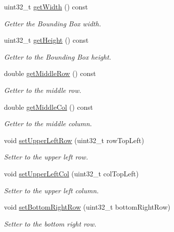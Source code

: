 \begin{DoxyCompactItemize}
uint32\+\_\+t \hyperlink{classfc_1_1BoundingBox_aecdcbec558ef3396ed42924d4937d981}{get\+Width} () const
\begin{DoxyCompactList}\small\item\em Getter the Bounding Box width. \end{DoxyCompactList}\item 
uint32\+\_\+t \hyperlink{classfc_1_1BoundingBox_a9f26359f081940896dcf90ab5d5f0132}{get\+Height} () const
\begin{DoxyCompactList}\small\item\em Getter to the Bounding Box height. \end{DoxyCompactList}\item 
double \hyperlink{classfc_1_1BoundingBox_a96d9180aacc790de07f07dde841e9d01}{get\+Middle\+Row} () const
\begin{DoxyCompactList}\small\item\em Getter to the middle row. \end{DoxyCompactList}\item 
double \hyperlink{classfc_1_1BoundingBox_a5d829bb45a327c47b4a6d4f563cbef0c}{get\+Middle\+Col} () const
\begin{DoxyCompactList}\small\item\em Getter to the middle column. \end{DoxyCompactList}\item 
void \hyperlink{classfc_1_1BoundingBox_a8007ac29ae2e3f15bfccf71d6f318716}{set\+Upper\+Left\+Row} (uint32\+\_\+t row\+Top\+Left)
\begin{DoxyCompactList}\small\item\em Setter to the upper left row. \end{DoxyCompactList}\item 
void \hyperlink{classfc_1_1BoundingBox_aabde814367dcfa4d1f1e23042d655cc4}{set\+Upper\+Left\+Col} (uint32\+\_\+t col\+Top\+Left)
\begin{DoxyCompactList}\small\item\em Setter to the upper left column. \end{DoxyCompactList}\item 
void \hyperlink{classfc_1_1BoundingBox_a88812242713670dc43c3137b0a962cbe}{set\+Bottom\+Right\+Row} (uint32\+\_\+t bottom\+Right\+Row)
\begin{DoxyCompactList}\small\item\em Setter to the bottom right row. \end{DoxyCompactList}\item 

\end{DoxyCompactItemize}

